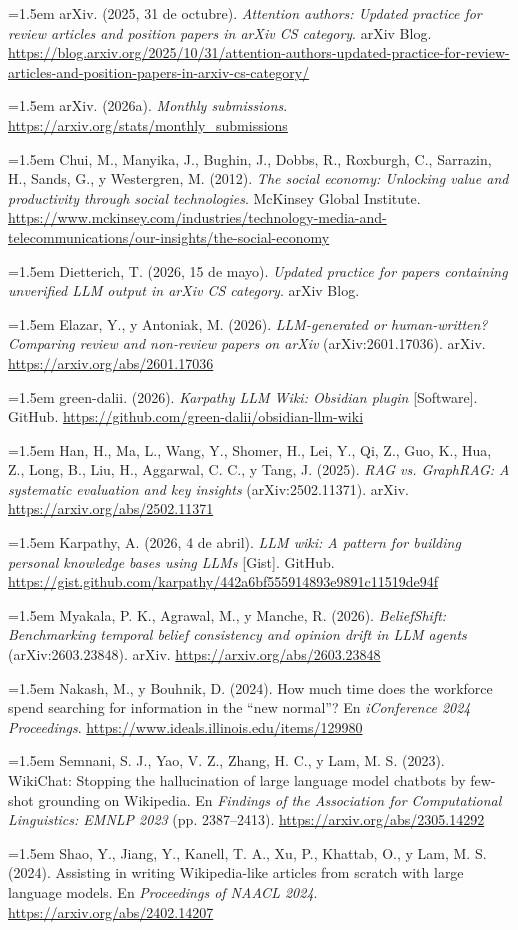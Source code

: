 \documentclass[11pt,letterpaper]{article}
\newcommand{\refhang}[1]{\par\noindent\hangindent=1.5em\hangafter=1 #1\par\vspace{2pt}}
\begin{document}
\small

\refhang{arXiv. (2025, 31 de octubre). \textit{Attention authors: Updated practice for review articles and position papers in arXiv CS category}. arXiv Blog. \url{https://blog.arxiv.org/2025/10/31/attention-authors-updated-practice-for-review-articles-and-position-papers-in-arxiv-cs-category/}}

\refhang{arXiv. (2026a). \textit{Monthly submissions}. \url{https://arxiv.org/stats/monthly_submissions}}

\refhang{Chui, M., Manyika, J., Bughin, J., Dobbs, R., Roxburgh, C., Sarrazin, H., Sands, G., y Westergren, M. (2012). \textit{The social economy: Unlocking value and productivity through social technologies}. McKinsey Global Institute. \url{https://www.mckinsey.com/industries/technology-media-and-telecommunications/our-insights/the-social-economy}}

\refhang{Dietterich, T. (2026, 15 de mayo). \textit{Updated practice for papers containing unverified LLM output in arXiv CS category}. arXiv Blog.}

\refhang{Elazar, Y., y Antoniak, M. (2026). \textit{LLM-generated or human-written? Comparing review and non-review papers on arXiv} (arXiv:2601.17036). arXiv. \url{https://arxiv.org/abs/2601.17036}}

\refhang{green-dalii. (2026). \textit{Karpathy LLM Wiki: Obsidian plugin} [Software]. GitHub. \url{https://github.com/green-dalii/obsidian-llm-wiki}}

\refhang{Han, H., Ma, L., Wang, Y., Shomer, H., Lei, Y., Qi, Z., Guo, K., Hua, Z., Long, B., Liu, H., Aggarwal, C. C., y Tang, J. (2025). \textit{RAG vs. GraphRAG: A systematic evaluation and key insights} (arXiv:2502.11371). arXiv. \url{https://arxiv.org/abs/2502.11371}}

\refhang{Karpathy, A. (2026, 4 de abril). \textit{LLM wiki: A pattern for building personal knowledge bases using LLMs} [Gist]. GitHub. \url{https://gist.github.com/karpathy/442a6bf555914893e9891c11519de94f}}

\refhang{Myakala, P. K., Agrawal, M., y Manche, R. (2026). \textit{BeliefShift: Benchmarking temporal belief consistency and opinion drift in LLM agents} (arXiv:2603.23848). arXiv. \url{https://arxiv.org/abs/2603.23848}}

\refhang{Nakash, M., y Bouhnik, D. (2024). How much time does the workforce spend searching for information in the ``new normal''? En \textit{iConference 2024 Proceedings}. \url{https://www.ideals.illinois.edu/items/129980}}

\refhang{Semnani, S. J., Yao, V. Z., Zhang, H. C., y Lam, M. S. (2023). WikiChat: Stopping the hallucination of large language model chatbots by few-shot grounding on Wikipedia. En \textit{Findings of the Association for Computational Linguistics: EMNLP 2023} (pp. 2387--2413). \url{https://arxiv.org/abs/2305.14292}}

\refhang{Shao, Y., Jiang, Y., Kanell, T. A., Xu, P., Khattab, O., y Lam, M. S. (2024). Assisting in writing Wikipedia-like articles from scratch with large language models. En \textit{Proceedings of NAACL 2024}. \url{https://arxiv.org/abs/2402.14207}}

\normalsize
\end{document}
